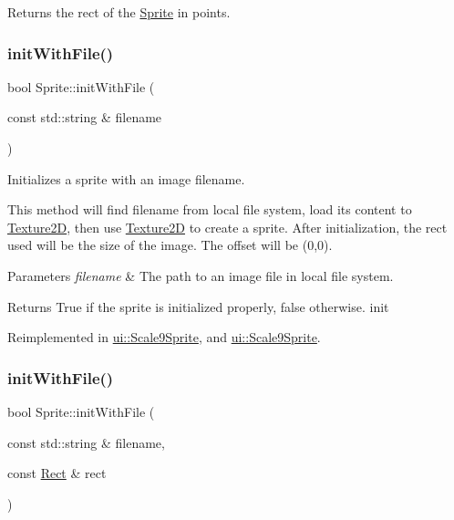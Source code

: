 Returns the rect of the \hyperlink{classSprite}{Sprite} in points. \mbox{\label{classSprite_aaf44b73e6e009525f1cd222985a5ed4f}} 
\subsubsection{\texorpdfstring{init\+With\+File()}{initWithFile()}\hspace{0.1cm}{\footnotesize\ttfamily [1/4]}}
{\footnotesize\ttfamily bool Sprite\+::init\+With\+File (\begin{DoxyParamCaption}\item[{const std\+::string \&}]{filename }\end{DoxyParamCaption})\hspace{0.3cm}{\ttfamily [virtual]}}

Initializes a sprite with an image filename.

This method will find filename from local file system, load its content to \hyperlink{classTexture2D}{Texture2D}, then use \hyperlink{classTexture2D}{Texture2D} to create a sprite. After initialization, the rect used will be the size of the image. The offset will be (0,0).


\begin{DoxyParams}{Parameters}
{\em filename} & The path to an image file in local file system. \\
\hline
\end{DoxyParams}
\begin{DoxyReturn}{Returns}
True if the sprite is initialized properly, false otherwise.  init 
\end{DoxyReturn}


Reimplemented in \hyperlink{classui_1_1Scale9Sprite_a2c5a440147b13f433454d65a20a31398}{ui\+::\+Scale9\+Sprite}, and \hyperlink{classui_1_1Scale9Sprite_ad3e4f907faf79e406320c10ca0785a39}{ui\+::\+Scale9\+Sprite}.

\mbox{\label{classSprite_af94c86a971b4ebab60cdd884e8902c06}} 
\subsubsection{\texorpdfstring{init\+With\+File()}{initWithFile()}\hspace{0.1cm}{\footnotesize\ttfamily [2/4]}}
{\footnotesize\ttfamily bool Sprite\+::init\+With\+File (\begin{DoxyParamCaption}\item[{const std\+::string \&}]{filename,  }\item[{const \hyperlink{classRect}{Rect} \&}]{rect }\end{DoxyParamCaption})\hspace{0.3cm}{\ttfamily [virtual]}}

